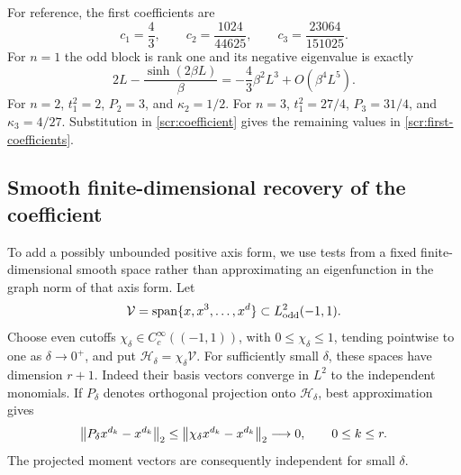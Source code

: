 For reference, the first coefficients are
\begin{equation}\label{scr:first-coefficients}
 c_1=\frac43,\qquad
 c_2=\frac{1024}{44625},\qquad
 c_3=\frac{23064}{151025}.
\end{equation}
For \(n=1\) the odd block is rank one and its negative eigenvalue
is exactly
\[
 2L-\frac{\sinh(2\beta L)}{\beta}
      =-\frac43\beta^2L^3+O(\beta^4L^5).
\]
For \(n=2\), \(t_1^2=2\), \(P_2=3\), and \(\kappa_2=1/2\).
For \(n=3\), \(t_1^2=27/4\), \(P_3=31/4\), and
\(\kappa_3=4/27\). Substitution in \eqref{scr:coefficient}
gives the remaining values in \eqref{scr:first-coefficients}.

\subsection{Smooth finite-dimensional recovery of the coefficient}

To add a possibly unbounded positive axis form, we use tests from
a fixed finite-dimensional smooth space rather than approximating
an eigenfunction in the graph norm of that axis form.
Let
\[
 \mathcal V=\operatorname{span}\{x,x^3,\ldots,x^d\}
                     \subset L^2_{\rm odd}(-1,1).
\]
Choose even cutoffs \(\chi_\delta\in C_c^\infty((-1,1))\),
with \(0\le\chi_\delta\le1\), tending pointwise to one as
\(\delta\to0^+\), and put
\(\mathcal H_\delta=\chi_\delta\mathcal V\).
For sufficiently small \(\delta\), these spaces have dimension
\(r+1\). Indeed their basis vectors converge in \(L^2\) to
the independent monomials. If \(P_\delta\) denotes orthogonal
projection onto \(\mathcal H_\delta\), best approximation gives
\begin{equation}\label{scr:projected-moments}
 \left\|P_\delta x^{d_k}-x^{d_k}\right\|_2
 \le\left\|\chi_\delta x^{d_k}-x^{d_k}\right\|_2\longrightarrow0,
 \qquad 0\le k\le r.
\end{equation}
The projected moment vectors are consequently independent for
small \(\delta\).

